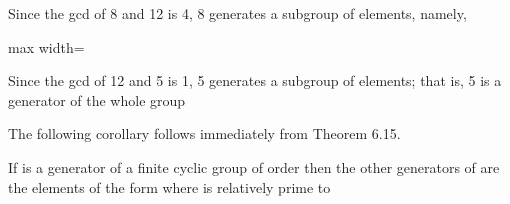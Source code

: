 \documentclass[11pt,oneside]{article}
\begin{document}
\begin{BookBody}
\noindent Since the gcd of 8 and 12 is 4, 8 generates a subgroup of  elements, namely,

\begin{center}\begin{adjustbox}{max width=\linewidth}\end{adjustbox}\end{center}

\noindent Since the gcd of 12 and 5 is 1, 5 generates a subgroup of  elements; that is, 5 is a generator of the whole group \BookEnd{\blacktriangle}

The following corollary follows immediately from Theorem 6.15.

 If  is a generator of a finite cyclic group  of order  then the other generators of  are the elements of the form  where  is relatively prime to 

\end{BookBody}

\BookNarrativetrue
\end{document}
